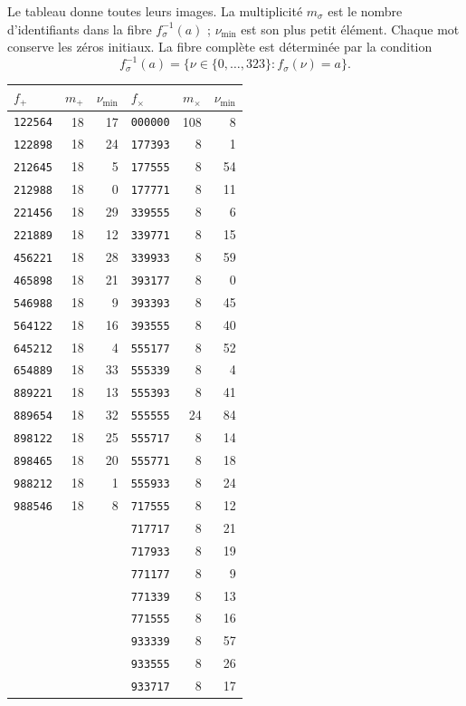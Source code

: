 Le tableau donne toutes leurs images. La multiplicité \(m_\sigma\) est le nombre
d’identifiants dans la fibre \(f_\sigma^{-1}(a)\) ; \(\nu_{\min}\) est son
plus petit élément. Chaque mot conserve les zéros initiaux. La fibre complète
est déterminée par la condition
\[
 f_\sigma^{-1}(a)=\{\nu\in\{0,\ldots,323\}:f_\sigma(\nu)=a\}.
\]
\begin{center}\small
\begin{tabular}{@{}lrr@{\qquad}lrr@{}}
\toprule
\(f_+\) & \(m_+\) & \(\nu_{\min}\) & \(f_\times\) & \(m_\times\) & \(\nu_{\min}\)\\
\midrule
\texttt{122564} & 18 & 17 & \texttt{000000} & 108 & 8 \\
\texttt{122898} & 18 & 24 & \texttt{177393} & 8 & 1 \\
\texttt{212645} & 18 & 5 & \texttt{177555} & 8 & 54 \\
\texttt{212988} & 18 & 0 & \texttt{177771} & 8 & 11 \\
\texttt{221456} & 18 & 29 & \texttt{339555} & 8 & 6 \\
\texttt{221889} & 18 & 12 & \texttt{339771} & 8 & 15 \\
\texttt{456221} & 18 & 28 & \texttt{339933} & 8 & 59 \\
\texttt{465898} & 18 & 21 & \texttt{393177} & 8 & 0 \\
\texttt{546988} & 18 & 9 & \texttt{393393} & 8 & 45 \\
\texttt{564122} & 18 & 16 & \texttt{393555} & 8 & 40 \\
\texttt{645212} & 18 & 4 & \texttt{555177} & 8 & 52 \\
\texttt{654889} & 18 & 33 & \texttt{555339} & 8 & 4 \\
\texttt{889221} & 18 & 13 & \texttt{555393} & 8 & 41 \\
\texttt{889654} & 18 & 32 & \texttt{555555} & 24 & 84 \\
\texttt{898122} & 18 & 25 & \texttt{555717} & 8 & 14 \\
\texttt{898465} & 18 & 20 & \texttt{555771} & 8 & 18 \\
\texttt{988212} & 18 & 1 & \texttt{555933} & 8 & 24 \\
\texttt{988546} & 18 & 8 & \texttt{717555} & 8 & 12 \\
 & &  & \texttt{717717} & 8 & 21 \\
 & &  & \texttt{717933} & 8 & 19 \\
 & &  & \texttt{771177} & 8 & 9 \\
 & &  & \texttt{771339} & 8 & 13 \\
 & &  & \texttt{771555} & 8 & 16 \\
 & &  & \texttt{933339} & 8 & 57 \\
 & &  & \texttt{933555} & 8 & 26 \\
 & &  & \texttt{933717} & 8 & 17 \\
\bottomrule
\end{tabular}
\end{center}

